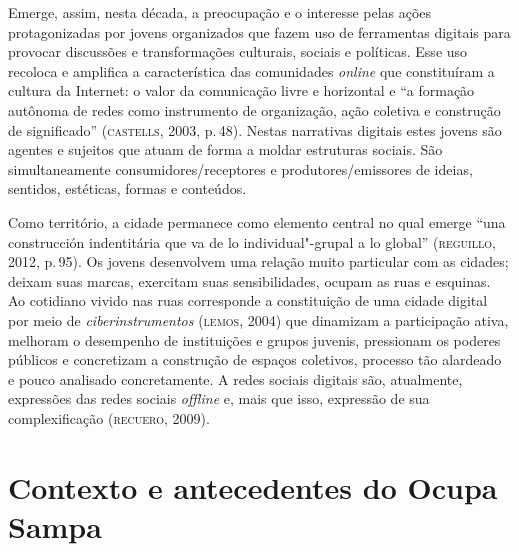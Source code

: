 Emerge, assim, nesta década, a preocupação e o interesse pelas ações
protagonizadas por jovens organizados que fazem uso de ferramentas
digitais para provocar discussões e transformações culturais, sociais e
políticas. Esse uso recoloca e amplifica a característica das
comunidades \emph{online} que constituíram a cultura da Internet: o
valor da comunicação livre e horizontal e ``a formação autônoma de redes
como instrumento de organização, ação coletiva e construção de
significado'' (\textsc{castells}, 2003, p.\,48). Nestas narrativas digitais
estes jovens são agentes e sujeitos que atuam de forma a moldar
estruturas sociais. São simultaneamente consumidores/receptores e
produtores/emissores de ideias, sentidos, estéticas, formas e conteúdos.

Como território, a cidade permanece como elemento central no qual emerge
``una construcción indentitária que va de lo individual"-grupal a lo
global'' (\textsc{reguillo}, 2012, p.\,95). Os jovens desenvolvem uma relação
muito particular com as cidades; deixam suas marcas, exercitam suas
sensibilidades, ocupam as ruas e esquinas. Ao cotidiano vivido nas ruas
corresponde a constituição de uma cidade digital por meio de
\emph{ciberinstrumentos} (\textsc{lemos}, 2004) que dinamizam a participação
ativa, melhoram o desempenho de instituições e grupos juvenis,
pressionam os poderes públicos e concretizam a construção de espaços
coletivos, processo tão alardeado e pouco analisado concretamente. A
redes sociais digitais são, atualmente, expressões das redes sociais
\emph{offline} e, mais que isso, expressão de sua complexificação
(\textsc{recuero}, 2009).

\section{Contexto e antecedentes do Ocupa Sampa}

